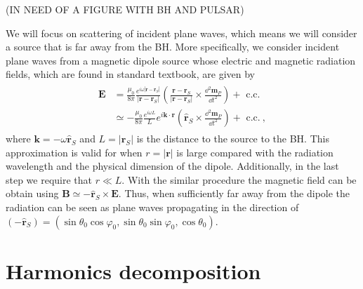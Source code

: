 (IN NEED OF A FIGURE WITH BH AND PULSAR)

We will focus on scattering of incident plane waves, which means we will consider a source that is far away from the BH.
More specifically, we consider incident plane waves from a magnetic dipole source whose electric and magnetic radiation fields, which are found in standard textbook, are given by
\begin{align}
    \begin{split}
        \mathbf{E} &= \frac{\mu_0}{8\pi}
        \frac{e^{i\omega|\mathbf{r}-\mathbf{r}_S|}}{|\mathbf{r}-\mathbf{r}_S|} \left(
        \frac{\mathbf{r}-\mathbf{r}_S}{|\mathbf{r}-\mathbf{r}_S|} \times
        \frac{\dd^2 \mathbf{m}_P}{\dd t^2} \right) + \text{ c.c.} \\
        & \simeq  - \frac{\mu_0}{8\pi} \frac{e^{i \omega L}}{L}
        e^{i \mathbf{k} \cdot \mathbf{r}} \left( \mathbf{\hat{r}}_S \times
        \frac{\dd^2 \mathbf{m}_P}{\dd t^2} \right) + \text{ c.c.} ~,
    \end{split}
\end{align}
where $\mathbf{k}= -\omega \mathbf{\hat{r}}_S$ and $L=|\mathbf{r}_S|$ is the distance to the source to the BH.
This approximation is valid for when $r=|\mathbf{r}|$ is large compared with the radiation wavelength and the physical dimension of the dipole.
Additionally, in the last step we require that $r \ll L$.  With the similar procedure the magnetic field can be obtain using $\mathbf{B}\simeq - \mathbf{\hat{r}}_S \times \mathbf{E}$.
Thus, when sufficiently far away from the dipole the radiation can be seen as plane waves propagating in the direction of $(- \mathbf{\hat{r}}_S) = (\sin\theta_0 \cos\varphi_0, \sin\theta_0 \sin\varphi_0, \cos\theta_0)$.


\section{Harmonics decomposition}


